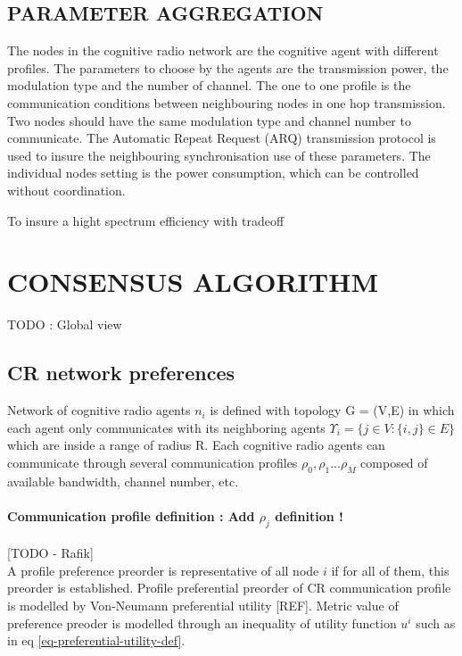 \documentclass[conference]{IEEEtran}
\begin{document}
\subsection{PARAMETER AGGREGATION}
The nodes in the cognitive radio network are the cognitive agent with different profiles. The parameters to choose by the agents are the transmission power, the modulation type and the number of channel. The one to one profile is the communication conditions between neighbouring nodes in one hop transmission. Two nodes should have the same modulation type and channel number to communicate. The Automatic Repeat Request (ARQ) transmission protocol is used to insure the neighbouring synchronisation use of these parameters. The individual nodes setting is the power consumption, which can be controlled without coordination. 
   
To insure a hight spectrum efficiency with tradeoff 

\section{CONSENSUS ALGORITHM}
TODO : Global view \\

\subsection{CR network preferences}
Network of cognitive radio agents $n_i$ is defined with topology G = (V,E) in which each agent only communicates with its neighboring agents $\Upsilon_i = \{j \in V : \{i,j\} \in E\}$ which are inside a range of radius R. Each cognitive radio agents can communicate through several communication profiles $\rho_0, \rho_1 ... \rho_M$ composed of available bandwidth, channel number, etc.

\paragraph*{Communication profile definition  : Add $\rho_j$ definition !}[TODO - Rafik] \\

A profile preference preorder is representative of all node $i$ if for all of them, this preorder is established. Profile preferential preorder of CR communication profile is modelled by Von-Neumann preferential utility [REF].  Metric value of preference preoder is modelled through an inequality of utility function $u^i$ such as in eq \ref{eq-preferential-utility-def}.  
\end{document}

